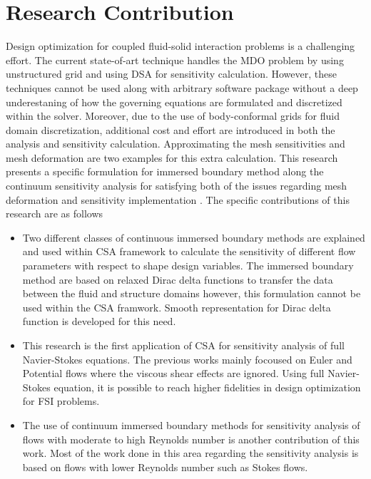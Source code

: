 \section{Research Contribution}
Design optimization for coupled fluid-solid interaction problems is a challenging effort. The current state-of-art technique handles the MDO problem by using unstructured grid and using DSA for sensitivity calculation. However, these techniques cannot be used along with arbitrary software package without a deep underestaning of how the governing equations are formulated and discretized within the solver. Moreover, due to the use of body-conformal grids for fluid domain discretization, additional cost and effort are introduced in both the analysis and sensitivity calculation. Approximating the mesh sensitivities and mesh deformation are two examples for this extra calculation. This research presents a specific formulation for immersed boundary method along the continuum sensitivity analysis for satisfying both of the issues regarding mesh deformation and sensitivity implementation \cite{gobal2014continuum}. The specific contributions of this research are as follows

\begin{itemize}
	\item Two different classes of continuous immersed boundary methods are explained and used within CSA framework to calculate the sensitivity of different flow parameters with respect to shape design variables. The immersed boundary method are based on relaxed Dirac delta functions to transfer the data between the fluid and structure domains however, this formulation cannot be used within the CSA framwork. Smooth representation for Dirac delta function is developed for this need.
	\item This research is the first application of CSA for sensitivity analysis of full Navier-Stokes equations. The previous works mainly focoused on Euler and Potential flows where the viscous shear effects are ignored. Using full Navier-Stokes equation, it is possible to reach higher fidelities in design optimization for FSI problems.
	\item The use of continuum immersed boundary methods for sensitivity analysis of flows with moderate to high Reynolds number is another contribution of this work. Most of the work done in this area regarding the sensitivity analysis is based on flows with lower Reynolds number such as Stokes flows.
\end{itemize}
